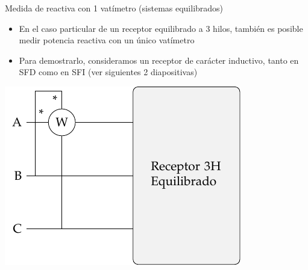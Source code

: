 \documentclass[aspectratio=169, usenames,svgnames,dvipsnames]{beamer}
\begin{document}
\begin{frame}{Medida de reactiva con 1 vatímetro \hspace{3mm}(sistemas equilibrados)}
    
    \vspace{2mm}
    \begin{itemize}
        \item En el caso particular de un \alert{receptor equilibrado} a 3 hilos, también es posible medir \alert{potencia reactiva} con un único vatímetro

        \vspace{2mm}
        \item Para demostrarlo, consideramos un \alert{receptor} de carácter \alert{inductivo}, tanto en \alert{SFD} como en \alert{SFI} \hspace{3mm}(ver siguientes 2 diapositivas)
    \end{itemize}    

    \begin{center}
        \includegraphics[width=.45\linewidth]{../figs/Reactiva3H_A-BC.pdf}
    \end{center}
\end{frame}

\end{document}
